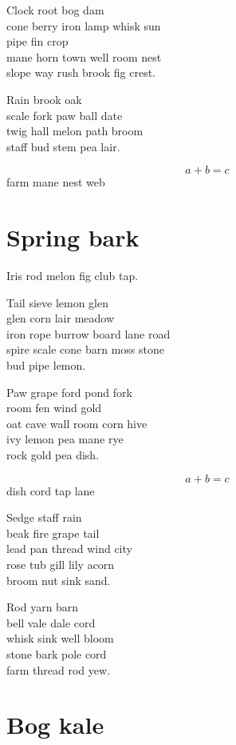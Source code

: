 \documentclass{memoir}
\begin{document}
Clock root bog dam \\
cone berry iron lamp whisk sun \\
pipe fin crop \\
mane horn town well room nest \\
slope way rush brook fig crest.

Rain brook oak \\
scale fork paw ball date \\
twig hall melon path broom \\
staff bud stem pea lair.

\begin{equation}
  a + b = c
\end{equation}
farm mane nest web

\section{Spring bark}

Iris rod melon fig club tap.

Tail sieve lemon glen \\
glen corn lair meadow \\
iron rope burrow board lane road \\
spire scale cone barn moss stone \\
bud pipe lemon.

Paw grape ford pond fork \\
room fen wind gold \\
oat cave wall room corn hive \\
ivy lemon pea mane rye \\
rock gold pea dish.

\begin{equation}
  a + b = c
\end{equation}
dish cord tap lane

Sedge staff rain \\
beak fire grape tail \\
lead pan thread wind city \\
rose tub gill lily acorn \\
broom nut sink sand.

Rod yarn barn \\
bell vale dale cord \\
whisk sink well bloom \\
stone bark pole cord \\
farm thread rod yew.

\section{Bog kale}
\end{document}
